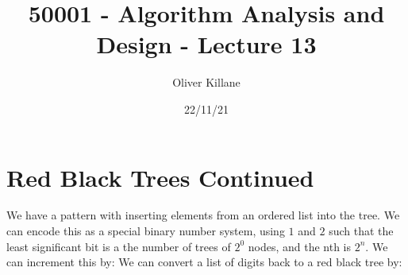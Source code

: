 \documentclass{report}
\title{50001 - Algorithm Analysis and Design - Lecture 13}
\author{Oliver Killane}
\date{22/11/21}
\begin{document}
    \maketitle

    \section*{Red Black Trees Continued}
        We have a pattern with inserting elements from an ordered list into the tree.
        We can encode this as a special binary number system, using $1$ and $2$ such that the least significant bit is a the number of trees of $2^0$ nodes, and the nth is $2^n$.
        We can increment this by:
        We can convert a list of digits back to a red black tree by:
\end{document}

